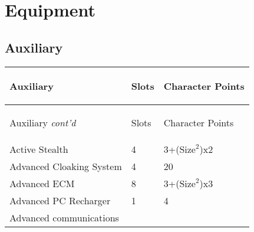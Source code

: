 \documentclass[twoside]{book}
\begin{document}
    

\section{Equipment}
    
    

\subsection{Auxiliary}
    
\begin{longtable}{p{1.25in}ll} 
  Auxiliary
  &
  \begin{turn}{70}{Slots}\end{turn}
          
  &
  \begin{turn}{70}{Character Points}\end{turn}
          
  \\
  \hline
  \hline
  \endfirsthead
  Auxiliary \textit{cont'd}
        
  &
  \begin{turn}{70}{Slots}\end{turn}
          
  &
  \begin{turn}{70}{Character Points}\end{turn}
          
  \\
  \hline
  \endhead
      
  \raggedright
           Active Stealth 
  &
   4 
  &
   3+(\begin{math}{\textrm{Size}}^{2}\end{math})x2
           
  \tabularnewline
      
  \raggedright
           Advanced Cloaking System
           
  &
   4 
  &
   20 
  \tabularnewline
      
  \raggedright
           Advanced ECM 
  &
   8 
  &
   3+(\begin{math}{\textrm{Size}}^{2}\end{math})x3
           
  \tabularnewline
      
  \raggedright
           Advanced PC Recharger 
  &
   1 
  &
   4 
  \tabularnewline
      
  \raggedright
           Advanced communications
           

\end{longtable}
\end{document}
